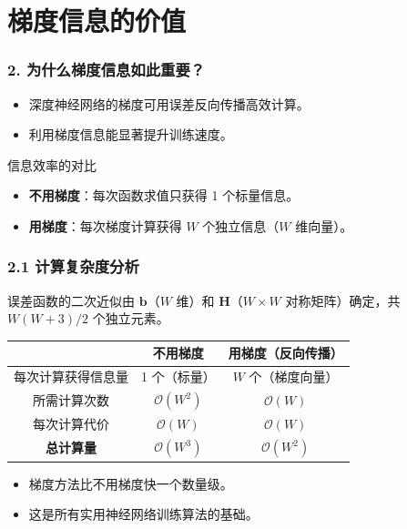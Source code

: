 \documentclass[t,aspectratio=169]{beamer} %
\begin{document}
\section{梯度信息的价值}

\begin{frame}
    \frametitle{2. 为什么梯度信息如此重要？}
    \begin{itemize}
        \item 深度神经网络的梯度可用\alert{误差反向传播}高效计算。
        \item 利用梯度信息能\alert{显著提升训练速度}。
    \end{itemize}
    \begin{block}{信息效率的对比}
        \begin{itemize}
            \item \textbf{不用梯度}：每次函数求值只获得 \alert{1 个标量信息}。
            \item \textbf{用梯度}：每次梯度计算获得 \alert{$W$ 个独立信息}（$W$ 维向量）。
        \end{itemize}
    \end{block}
\end{frame}

\begin{frame}
    \frametitle{2.1 计算复杂度分析}
    误差函数的二次近似由 $\mathbf{b}$（$W$ 维）和 $\mathbf{H}$（$W \times W$ 对称矩阵）确定，共 $W(W+3)/2$ 个独立元素。
    \begin{table}
        \centering
        \renewcommand{\arraystretch}{1.5}
        \begin{tabular}{|c|c|c|}
            \hline
             & 不用梯度 & 用梯度（反向传播） \\
            \hline
            每次计算获得信息量 & 1 个（标量） & $W$ 个（梯度向量） \\
            \hline
            所需计算次数 & $\mathcal{O}(W^2)$ & $\mathcal{O}(W)$ \\
            \hline
            每次计算代价 & $\mathcal{O}(W)$ & $\mathcal{O}(W)$ \\
            \hline
            \textbf{总计算量} & $\mathcal{O}(W^3)$ & $\mathcal{O}(W^2)$ \\
            \hline
        \end{tabular}
    \end{table}
    \begin{itemize}
        \item 梯度方法比不用梯度\alert{快一个数量级}。
        \item 这是所有实用神经网络训练算法的基础。
    \end{itemize}
\end{frame}
\end{document}
